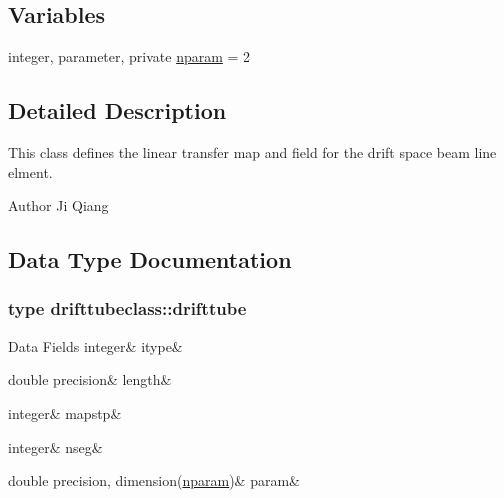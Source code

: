 \subsection*{Variables}
\begin{DoxyCompactItemize}
\item 
integer, parameter, private \mbox{\hyperlink{namespacedrifttubeclass_af382d7cef81496c1d2c2bf3ba72c4350}{nparam}} = 2
\end{DoxyCompactItemize}


\subsection{Detailed Description}
This class defines the linear transfer map and field for the drift space beam line elment. 

\begin{DoxyAuthor}{Author}
Ji Qiang 
\end{DoxyAuthor}


\subsection{Data Type Documentation}
\label{structdrifttubeclass_1_1drifttube}
\subsubsection{type drifttubeclass\+::drifttube}
\begin{DoxyFields}{Data Fields}
\mbox{\label{namespacedrifttubeclass_a1155bc20a840fce9a823eba951439db2}} 
integer&
itype&
\\
\hline

\mbox{\label{namespacedrifttubeclass_afec6676520da9cf2c2dd6a8298f8577b}} 
double precision&
length&
\\
\hline

\mbox{\label{namespacedrifttubeclass_a32a529cb8bf2da679620c46a2ac0bd6d}} 
integer&
mapstp&
\\
\hline

\mbox{\label{namespacedrifttubeclass_ac9c97374879fd6cd44d8ff391152ce6f}} 
integer&
nseg&
\\
\hline

\mbox{\label{namespacedrifttubeclass_abc755647bb29543bf6f4d65f7af740d4}} 
double precision, dimension(\mbox{\hyperlink{namespacedrifttubeclass_af382d7cef81496c1d2c2bf3ba72c4350}{nparam}})&
param&
\\
\hline

\end{DoxyFields}


